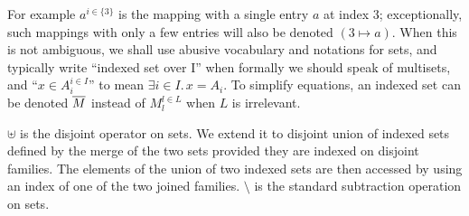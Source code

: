 \documentclass{lncs/llncs}
\begin{document}
For example $a^{i\in\{3\}}$ is
the mapping with a single entry $a$ at index $3$; exceptionally, such mappings with
only a few entries will also be denoted $(3\mapsto a)$.
When this is not ambiguous, we shall use abusive vocabulary and
notations for sets, and typically write ``indexed set over I'' when  
formally we should speak of multisets, and ``$x\in
A_i^{i\in I}$'' to mean $\exists i\in I.\, x=A_i$.
To simplify equations, an indexed set can be denoted $\overline{M}$
instead of $M_l^{l\in L}$ when $L$ is irrelevant.

$\uplus$ is the disjoint operator on sets. We extend it to  disjoint union  of indexed 
sets defined by the merge of the 
two sets provided they are indexed on disjoint families.
The elements
of the union of two indexed sets are then accessed by using an index of one of the two
joined families.
$\setminus$ is the standard subtraction operation on sets.

\end{document}
